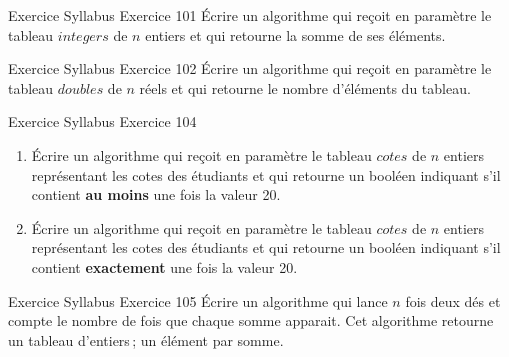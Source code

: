 \begin{frame}{Exercice \theexercice}{Syllabus Exercice 101}
    Écrire un algorithme qui reçoit en paramètre le tableau $integers$
    de $n$ entiers et qui retourne la somme de ses éléments.
\end{frame}

\begin{frame}{Exercice \theexercice}{Syllabus Exercice 102}
    Écrire un algorithme qui reçoit en paramètre le tableau $doubles$ de
    $n$ réels et qui retourne le nombre d’éléments du tableau.
\end{frame}

\begin{frame}{Exercice \theexercice}{Syllabus Exercice 104}
    \begin{enumerate}
        \item Écrire un algorithme qui reçoit en paramètre le tableau
        $cotes$ de $n$ entiers représentant les cotes des étudiants
        et qui retourne un booléen indiquant s’il contient \textbf{au
        moins} une fois la valeur 20.

        \item Écrire un algorithme qui reçoit en paramètre le tableau
        $cotes$ de $n$ entiers représentant les cotes des étudiants
        et qui retourne un booléen indiquant s’il contient
        \textbf{exactement} une fois la valeur 20.

    \end{enumerate}
\end{frame}

\begin{frame}{Exercice \theexercice}{Syllabus Exercice 105}
    Écrire un algorithme qui lance $n$ fois deux dés et compte le nombre de
    fois que chaque somme apparait. Cet algorithme retourne un tableau
    d'entiers\,; un élément par somme.
\end{frame}

